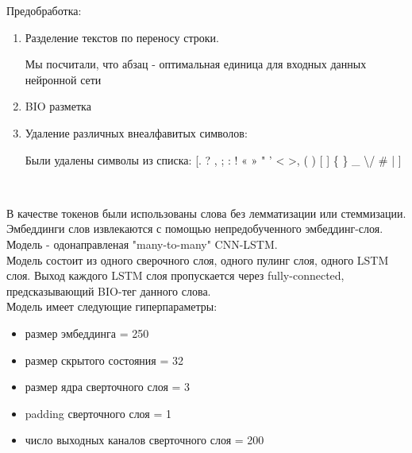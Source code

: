 \documentclass{article}
\begin{document}
Предобработка:

\begin{enumerate}
    \item Разделение текстов по переносу строки.

        Мы посчитали, что абзац - оптимальная единица для входных данных нейронной сети

    \item BIO разметка

    \item Удаление различных внеалфавитых символов:

        Были удалены символы из списка: [. ? , ; : ! « » " ' < >,  ( ) [ ] \{ \} \newline
         \─ \- \_ \textbackslash / \# \№ | ] %

\end{enumerate}  \\


\vspace{14pt}

В качестве токенов были использованы слова без лемматизации или стеммизации. \\ %

Эмбеддинги слов извлекаются с помощью непредобученного эмбеддинг-слоя. \\

Модель - одонаправленая "many-to-many"  CNN-LSTM. \\

Модель состоит из одного сверочного слоя, одного пулинг слоя, одного LSTM слоя. Выход каждого LSTM слоя пропускается через fully-connected, предсказывающий BIO-тег данного слова. \\

Модель имеет следующие гиперпараметры:
\begin{itemize}
    \item размер эмбеддинга = 250
    \item размер скрытого состояния = 32 
    \item размер ядра сверточного слоя = 3
    \item padding сверточного слоя = 1
    \item число выходных каналов сверточного слоя = 200
\end{itemize}

\\
\end{document}

